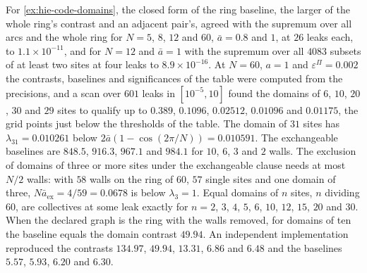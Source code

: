 \begin{numcheck}
For \cref{ex:hie-code-domains}, the closed form of the ring baseline, the larger of the whole ring's contrast and an adjacent pair's, agreed with the supremum over all arcs and the whole ring for $N=5$, $8$, $12$ and $60$, $\bar a=0.8$ and $1$, at $26$ leaks each, to $1.1\times10^{-11}$, and for $N=12$ and $\bar a=1$ with the supremum over all $4083$ subsets of at least two sites at four leaks to $8.9\times10^{-16}$. At $N=60$, $a=1$ and $\varepsilon^\Pi=0.002$ the contrasts, baselines and significances of the table were computed from the precisions, and a scan over $601$ leaks in $[10^{-5},10]$ found the domains of $6$, $10$, $20$, $30$ and $29$ sites to qualify up to $0.389$, $0.1096$, $0.02512$, $0.01096$ and $0.01175$, the grid points just below the thresholds of the table. The domain of $31$ sites has $\lambda_{31}=0.010261$ below $2\bar a(1-\cos(2\pi/N))=0.010591$. The exchangeable baselines are $848.5$, $916.3$, $967.1$ and $984.1$ for $10$, $6$, $3$ and $2$ walls. The exclusion of domains of three or more sites under the exchangeable clause needs at most $N/2$ walls: with $58$ walls on the ring of $60$, $57$ single sites and one domain of three, $N\bar a_{\mathrm{ex}}=4/59=0.0678$ is below $\lambda_3=1$. Equal domains of $n$ sites, $n$ dividing $60$, are collectives at some leak exactly for $n=2$, $3$, $4$, $5$, $6$, $10$, $12$, $15$, $20$ and $30$. When the declared graph is the ring with the walls removed, for domains of ten the baseline equals the domain contrast $49.94$. An independent implementation reproduced the contrasts $134.97$, $49.94$, $13.31$, $6.86$ and $6.48$ and the baselines $5.57$, $5.93$, $6.20$ and $6.30$.
\end{numcheck}

